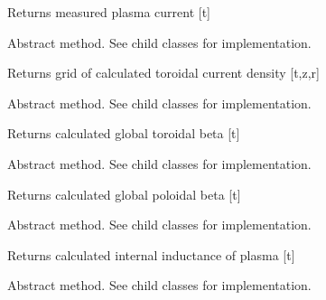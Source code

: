 \documentclass[letterpaper,10pt,english]{sphinxmanual}
\begin{document}
\begin{fulllineitems}
\begin{fulllineitems}
Returns measured plasma current {[}t{]}

\end{fulllineitems}


\begin{fulllineitems}
\label{eqtools:eqtools.core.Equilibrium.getJp}
Abstract method.  See child classes for implementation.

Returns grid of calculated toroidal current density {[}t,z,r{]}

\end{fulllineitems}


\begin{fulllineitems}
\label{eqtools:eqtools.core.Equilibrium.getBetaT}
Abstract method.  See child classes for implementation.

Returns calculated global toroidal beta {[}t{]}

\end{fulllineitems}


\begin{fulllineitems}
\label{eqtools:eqtools.core.Equilibrium.getBetaP}
Abstract method.  See child classes for implementation.

Returns calculated global poloidal beta {[}t{]}

\end{fulllineitems}


\begin{fulllineitems}
\label{eqtools:eqtools.core.Equilibrium.getLi}
Abstract method.  See child classes for implementation.

Returns calculated internal inductance of plasma {[}t{]}

\end{fulllineitems}


\begin{fulllineitems}
\label{eqtools:eqtools.core.Equilibrium.getBetas}
Abstract method.  See child classes for implementation.


\end{fulllineitems}
\end{fulllineitems}
\end{document}
